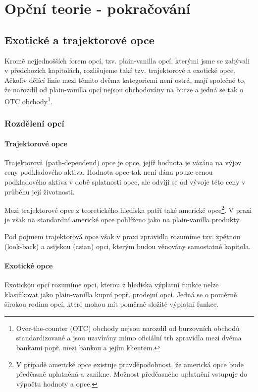 \documentclass[a4paper]{book}
\begin{document}
\part{Opční teorie - pokračování}

\chapter{Exotické a trajektorové opce}

Kromě nejjednošších forem opcí, tzv. plain-vanilla opcí, kterými jsme se zabývali v předchozích kapitolách, rozlišujeme také tzv. trajektorové a exotické opce. Ačkoliv dělící linie mezi těmito dvěma kategoriemi není ostrá, mají společné to, že narozdíl od plain-vanilla opcí nejsou obchodovány na burze a jedná se tak o OTC obchody\footnote{Over-the-counter (OTC) obchody nejsou narozdíl od burzovních obchodů standardizované a jsou uzavírány mimo oficiální trh zpravidla mezi dvěma bankami popř. mezi bankou a jejím klientem.}.

\section{Rozdělení opcí}

\subsection{Trajektorové opce}

Trajektorová (path-dependend) opce je opce, jejíž hodnota je vázána na výjov ceny podkladového aktiva. Hodnota opce tak není dána pouze cenou podkladového aktiva v době splatnosti opce, ale odvíjí se od vývoje této ceny v průběhu její životnosti.

Mezi trajektorové opce z teoretického hlediska patří také americké opce\footnote{V případě americké opce existuje pravděpodobnost, že americká opce bude předčasně uplatněná a zanikne. Možnost předčasného uplatnění vstupuje do výpočtu hodnoty a opce.}. V praxi je však na standardní americké opce pohlíženo jako na plain-vanilla produkty.

Pod pojmem trajektorová opce však v praxi zpravidla rozumíme tzv. zpětnou (look-back) a asijskou (asian) opci, kterým budou věnovány samostatné kapitola.

\subsection{Exotické opce}

Exotickou opcí rozumíme opci, kterou z hlediska výplatní funkce nelze klasifikovat jako plain-vanilla kupní popř. prodejní opci. Jedná se o poměrně širokou rodinu opcí, které mohou mít poměrně složité výplatní funkce.
\end{document}
